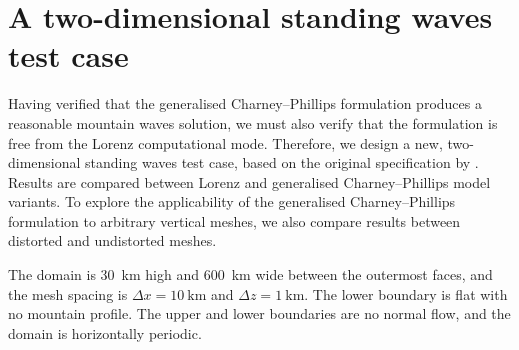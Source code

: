 \section{A two-dimensional standing waves test case}
\label{sec:cp:arakawaKonor}


Having verified that the generalised Charney--Phillips formulation produces a reasonable mountain waves solution, we must also verify that the formulation is free from the Lorenz computational mode.
Therefore, we design a new, two-dimensional standing waves test case, based on the original specification by \citet{arakawa-konor1996}.
Results are compared between Lorenz and generalised Charney--Phillips model variants.
To explore the applicability of the generalised Charney--Phillips formulation to arbitrary vertical meshes, we also compare results between distorted and undistorted meshes.

The domain is \SI{30}{\kilo\meter} high and \SI{600}{\kilo\meter} wide between the outermost faces, and the mesh spacing is $\Delta x = \SI{10}{\kilo\meter}$ and $\Delta z = \SI{1}{\kilo\meter}$.  The lower boundary is flat with no mountain profile.
The upper and lower boundaries are no normal flow, and the domain is horizontally periodic.

